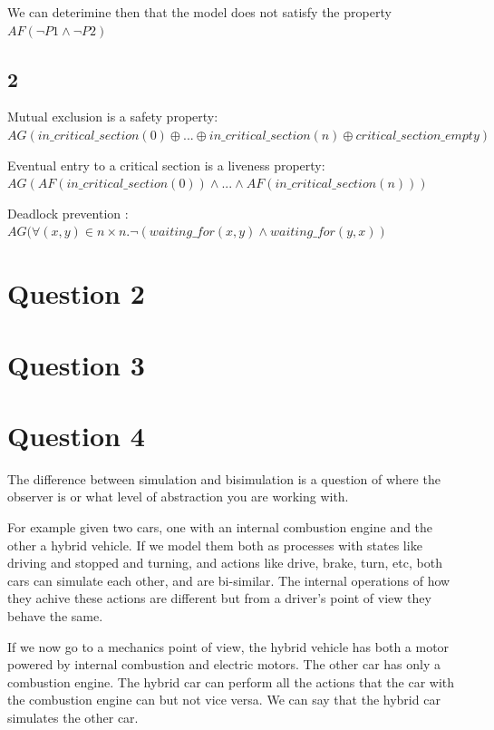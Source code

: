 \documentclass{scrartcl}
\begin{document}
We can deterimine then that the model does not satisfy the property $AF(\neg P1 \wedge \neg P2)$

\subsection{2}
Mutual exclusion is a safety property: 
$AG(in\_critical\_section(0)  \oplus ...\oplus in\_critical\_section(n) \oplus critical\_section\_empty)$

Eventual entry to a critical section is a liveness property: $AG(AF(in\_critical\_section(0)) \wedge ... \wedge AF(in\_critical\_section(n)))$

Deadlock prevention : $AG(\forall (x, y) \in n \times n. \neg (waiting\_for(x, y) \wedge waiting\_for(y, x))$

\section{Question 2}
\section{Question 3}
\section{Question 4}
The difference between simulation and bisimulation is a question of where the observer is or what level of abstraction you are working with.

For example given two cars, one with an internal combustion engine and the other a hybrid vehicle. If we model them both as processes with states like driving and stopped and turning, and actions like drive, brake, turn, etc, both cars can simulate each other, and are bi-similar. The internal operations of how they achive these actions are different but from a driver's point of view they behave the same.

If we now go to a mechanics point of view, the hybrid vehicle has both a motor powered by internal combustion and electric motors. The other car has only a combustion engine. The hybrid car can perform all the actions that the car with the combustion engine can but not vice versa. We can say that the hybrid car simulates the other car.
\end{document}
